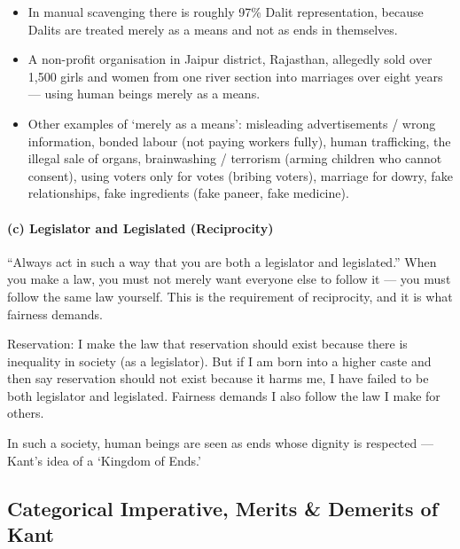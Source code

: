 \begin{DataFact}
\begin{itemize}
\item In manual scavenging there is roughly 97\% Dalit representation, because Dalits are treated merely as a means and not as ends in themselves.
\item A non-profit organisation in Jaipur district, Rajasthan, allegedly sold over 1,500 girls and women from one river section into marriages over eight years --- using human beings merely as a means.
\end{itemize}
\end{DataFact}

\begin{itemize}
\item Other examples of `merely as a means': misleading advertisements / wrong information, bonded labour (not paying workers fully), human trafficking, the illegal sale of organs, brainwashing / terrorism (arming children who cannot consent), using voters only for votes (bribing voters), marriage for dowry, fake relationships, fake ingredients (fake paneer, fake medicine).
\end{itemize}

\paragraph{(c) Legislator and Legislated (Reciprocity)}

\begin{KeyConcept}
``Always act in such a way that you are both a legislator and legislated.'' When you make a law, you must not merely want everyone else to follow it --- you must follow the same law yourself. This is the requirement of reciprocity, and it is what fairness demands.
\end{KeyConcept}

\begin{ExampleBox}
Reservation: I make the law that reservation should exist because there is inequality in society (as a legislator). But if I am born into a higher caste and then say reservation should not exist because it harms me, I have failed to be both legislator and legislated. Fairness demands I also follow the law I make for others.
\end{ExampleBox}

In such a society, human beings are seen as ends whose dignity is respected --- Kant's idea of a `Kingdom of Ends.'

\subsection{Categorical Imperative, Merits \& Demerits of Kant}

